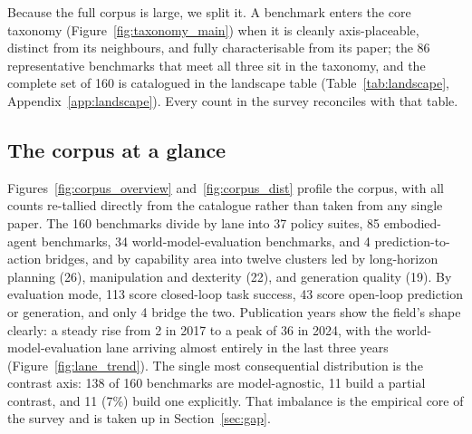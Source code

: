 Because the full corpus is large, we split it. A benchmark enters the core taxonomy
(Figure~\ref{fig:taxonomy_main}) when it is cleanly axis-placeable, distinct from its neighbours, and
fully characterisable from its paper; the 86 representative benchmarks that meet all three sit in the
taxonomy, and the complete set of 160 is catalogued in the landscape table
(Table~\ref{tab:landscape}, Appendix~\ref{app:landscape}). Every count in the survey reconciles with
that table.



\subsection{The corpus at a glance}

Figures~\ref{fig:corpus_overview} and~\ref{fig:corpus_dist} profile the corpus, with all counts
re-tallied directly from the catalogue rather than taken from any single paper. The 160 benchmarks
divide by lane into 37 policy suites, 85 embodied-agent benchmarks, 34 world-model-evaluation
benchmarks, and 4 prediction-to-action bridges, and by capability area into twelve clusters led by
long-horizon planning (26), manipulation and dexterity (22), and generation quality (19). By
evaluation mode, 113 score closed-loop task success, 43 score open-loop prediction or generation, and
only 4 bridge the two. Publication years show the field's shape clearly: a steady rise from 2 in 2017
to a peak of 36 in 2024, with the world-model-evaluation lane arriving almost entirely in the last
three years (Figure~\ref{fig:lane_trend}). The single most consequential distribution is the contrast
axis: 138 of 160 benchmarks are model-agnostic, 11 build a partial contrast, and 11 (7\%) build one
explicitly. That imbalance is the empirical core of the survey and is taken up in
Section~\ref{sec:gap}.




